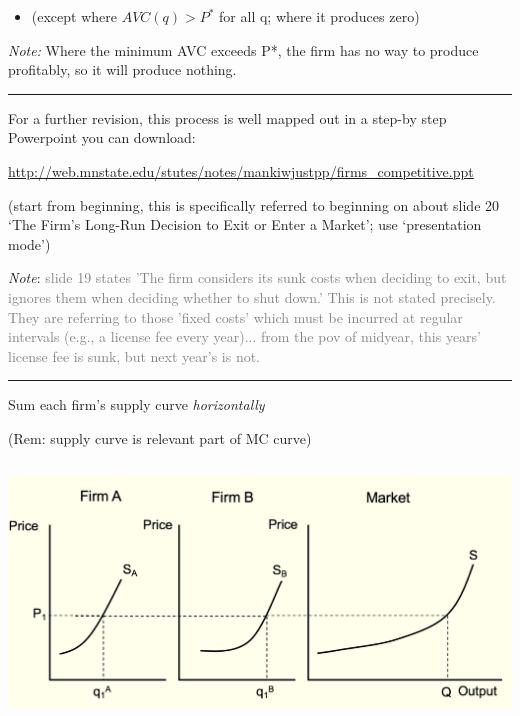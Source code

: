 \documentclass[]{article}
\providecommand{\tightlist}{%
  \setlength{\itemsep}{0pt}\setlength{\parskip}{0pt}}
\begin{document}
\begin{itemize}
\tightlist
\item
  (except where \(AVC(q)>P^*\) for all q; where it produces zero)
\end{itemize}

\emph{Note:} Where the minimum AVC exceeds P*, the firm has no way to
produce profitably, so it will produce nothing.

\begin{center}\rule{0.5\linewidth}{\linethickness}\end{center}

For a further revision, this process is well mapped out in a step-by
step Powerpoint you can download:

\url{http://web.mnstate.edu/stutes/notes/mankiwjustpp/firms_competitive.ppt}

(start from beginning, this is specifically referred to beginning on
about slide 20 `The Firm's Long-Run Decision to Exit or Enter a Market';
use `presentation mode')

\emph{Note}:
\textcolor{gray}{slide 19 states 'The firm considers its sunk costs when deciding to exit, but ignores them when deciding whether to shut down.' This is not stated precisely. They are referring to those 'fixed costs' which must be incurred at regular intervals (e.g., a license fee every year)... from the pov of midyear, this years' license fee is sunk, but next year's is not.}

\begin{center}\rule{0.5\linewidth}{\linethickness}\end{center}

Sum each firm's supply curve \emph{horizontally}

\bigskip

(Rem: supply curve is relevant part of MC curve)

\includegraphics[height=2.7in]{picsfigs/srsupply.png}
\end{document}
